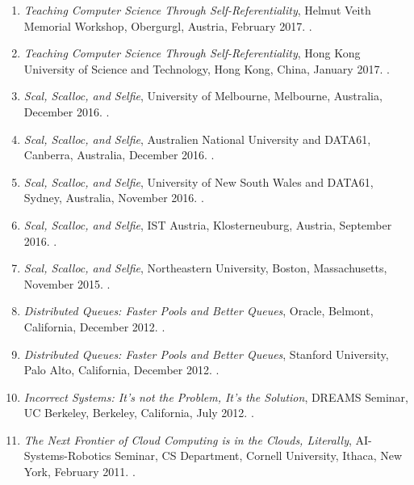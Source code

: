{\begin{enumerate}
\item \emph{Teaching Computer Science Through Self-Referentiality},
Helmut Veith Memorial Workshop, Obergurgl, Austria, February 2017.
.

\item \emph{Teaching Computer Science Through Self-Referentiality},
Hong Kong University of Science and Technology, Hong Kong, China, January 2017.
.

\item \emph{Scal, Scalloc, and Selfie},
University of Melbourne, Melbourne, Australia, December 2016.
.

\item \emph{Scal, Scalloc, and Selfie},
Australien National University and DATA61, Canberra, Australia, December 2016.
.

\item \emph{Scal, Scalloc, and Selfie},
University of New South Wales and DATA61, Sydney, Australia, November 2016.
.

\item \emph{Scal, Scalloc, and Selfie},
IST Austria, Klosterneuburg, Austria, September 2016.
.

\item \emph{Scal, Scalloc, and Selfie},
Northeastern University, Boston, Massachusetts, November 2015.
.

\item \emph{Distributed Queues: Faster Pools and Better Queues},
Oracle, Belmont, California, December 2012.
.

\item \emph{Distributed Queues: Faster Pools and Better Queues},
Stanford University, Palo Alto, California, December 2012.
.

\item \emph{Incorrect Systems: It's not the Problem, It's the Solution},
DREAMS Seminar, UC Berkeley, Berkeley, California, July 2012.
.

\item \emph{The Next Frontier of Cloud Computing is in the Clouds, Literally}, AI-Systems-Robotics Seminar, CS Department, Cornell University, Ithaca, New York, February 2011.
.


\end{enumerate}}
